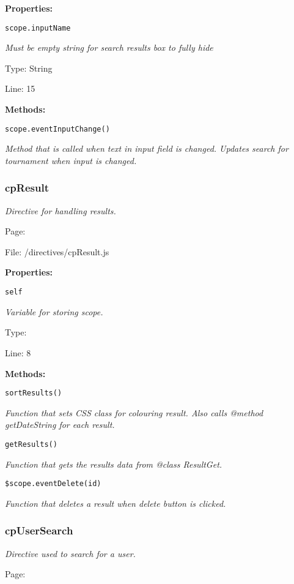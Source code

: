 \textbf{Properties:}

\texttt{scope.inputName}

{\scriptsize
\textit{Must be empty string for search results box to fully hide}

Type: String

Line: 15

}
\textbf{Methods:}

\texttt{scope.eventInputChange()}

{\scriptsize
\textit{Method that is called when text in input field is changed.
Updates search for tournament when input is changed.}

}

\subsubsection{cpResult}\label{cpResult.js.doc}
\textit{Directive for handling results.}

Page: \pageref{cpResult.js}

File: /directives/cpResult.js

\textbf{Properties:}

\texttt{self}

{\scriptsize
\textit{Variable for storing scope.}

Type: 

Line: 8

}
\textbf{Methods:}

\texttt{sortResults()}

{\scriptsize
\textit{Function that sets CSS class for colouring result.
Also calls @method getDateString for each result.}

}

\texttt{getResults()}

{\scriptsize
\textit{Function that gets the results data from @class ResultGet.}

}

\texttt{\$scope.eventDelete(id)}

{\scriptsize
\textit{Function that deletes a result when delete button is clicked.}

}

\subsubsection{cpUserSearch}\label{cpUserSearch.js.doc}
\textit{Directive used to search for a user.}

Page: \pageref{cpUserSearch.js}

